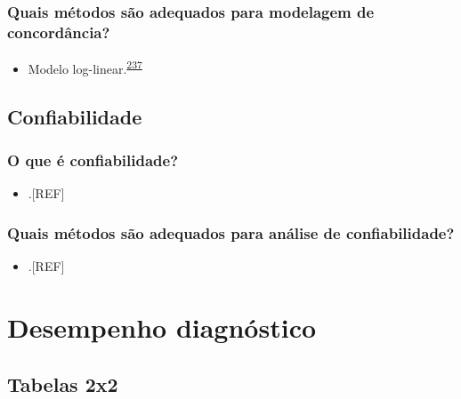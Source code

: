 \documentclass[
  a4paper,
]{book}
\providecommand{\tightlist}{%
  \setlength{\itemsep}{0pt}\setlength{\parskip}{0pt}}
\begin{document}
\hypertarget{quais-muxe9todos-suxe3o-adequados-para-modelagem-de-concorduxe2ncia}{%
\subsection{Quais métodos são adequados para modelagem de concordância?}\label{quais-muxe9todos-suxe3o-adequados-para-modelagem-de-concorduxe2ncia}}

\begin{itemize}
\tightlist
\item
  Modelo log-linear.\textsuperscript{\protect\hyperlink{ref-banerjee1999}{237}}
\end{itemize}

\hypertarget{confiabilidade}{%
\section{Confiabilidade}\label{confiabilidade}}

\hypertarget{o-que-uxe9-confiabilidade}{%
\subsection{O que é confiabilidade?}\label{o-que-uxe9-confiabilidade}}

\begin{itemize}
\tightlist
\item
  .{[}REF{]}
\end{itemize}

\hypertarget{quais-muxe9todos-suxe3o-adequados-para-anuxe1lise-de-confiabilidade}{%
\subsection{Quais métodos são adequados para análise de confiabilidade?}\label{quais-muxe9todos-suxe3o-adequados-para-anuxe1lise-de-confiabilidade}}

\begin{itemize}
\tightlist
\item
  .{[}REF{]}
\end{itemize}

\hypertarget{analise-desempenho-diagnostico}{%
\chapter{\texorpdfstring{\textbf{Desempenho diagnóstico}}{Desempenho diagnóstico}}\label{analise-desempenho-diagnostico}}

\hypertarget{tabelas-2x2}{%
\section{Tabelas 2x2}\label{tabelas-2x2}}
\end{document}
